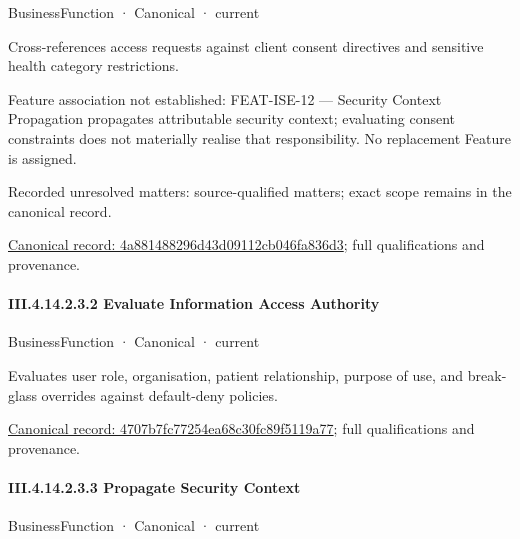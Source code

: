 \label{element:4a881488296d43d09112cb046fa836d3}
{\small BusinessFunction · Canonical · current}\par

Cross-references access requests against client consent directives and sensitive health category restrictions.



Feature association not established: FEAT-ISE-12 — Security Context Propagation propagates attributable security context; evaluating consent constraints does not materially realise that responsibility. No replacement Feature is assigned.


{\small Recorded unresolved matters: source-qualified matters; exact scope remains in the canonical record.}\par
{\footnotesize \href{../../../../../../../continuum/business/business-function/4a881488296d43d09112cb046fa836d3.md}{Canonical record: 4a881488296d43d09112cb046fa836d3}; full qualifications and provenance.}\par
\paragraph*{III.4.14.2.3.2 Evaluate Information Access Authority}
\label{navigation:III.4.14.2.3.2}

\label{element:4707b7fc77254ea68c30fc89f5119a77}
{\small BusinessFunction · Canonical · current}\par

Evaluates user role, organisation, patient relationship, purpose of use, and break-glass overrides against default-deny policies.


{\footnotesize \href{../../../../../../../continuum/business/business-function/4707b7fc77254ea68c30fc89f5119a77.md}{Canonical record: 4707b7fc77254ea68c30fc89f5119a77}; full qualifications and provenance.}\par
\paragraph*{III.4.14.2.3.3 Propagate Security Context}
\label{navigation:III.4.14.2.3.3}

\label{element:ee79679c6b5041659a2efca15190454f}
{\small BusinessFunction · Canonical · current}\par


